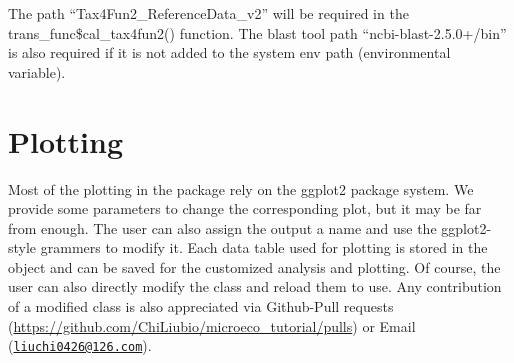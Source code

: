 \documentclass[
]{book}
\newenvironment{Shaded}{\begin{snugshade}}{\end{snugshade}}
\newcommand{\AttributeTok}[1]{\textcolor[rgb]{0.77,0.63,0.00}{#1}}
\newcommand{\CommentTok}[1]{\textcolor[rgb]{0.56,0.35,0.01}{\textit{#1}}}
\newcommand{\ConstantTok}[1]{\textcolor[rgb]{0.00,0.00,0.00}{#1}}
\newcommand{\FunctionTok}[1]{\textcolor[rgb]{0.00,0.00,0.00}{#1}}
\newcommand{\NormalTok}[1]{#1}
\newcommand{\OtherTok}[1]{\textcolor[rgb]{0.56,0.35,0.01}{#1}}
\newcommand{\SpecialCharTok}[1]{\textcolor[rgb]{0.00,0.00,0.00}{#1}}
\newcommand{\StringTok}[1]{\textcolor[rgb]{0.31,0.60,0.02}{#1}}
\begin{document}
The path ``Tax4Fun2\_ReferenceData\_v2'' will be required in the trans\_func\$cal\_tax4fun2() function.
The blast tool path ``ncbi-blast-2.5.0+/bin'' is also required if it is not added to the system env path (environmental variable).

\begin{Shaded}
\end{Shaded}

\hypertarget{plotting}{%
\section{Plotting}\label{plotting}}

Most of the plotting in the package rely on the ggplot2 package system.
We provide some parameters to change the corresponding plot, but it may be far from enough.
The user can also assign the output a name and use the ggplot2-style grammers to modify it.
Each data table used for plotting is stored in the object and can be saved for the customized analysis and plotting.
Of course, the user can also directly modify the class and reload them to use.
Any contribution of a modified class is also appreciated via Github-Pull requests (\url{https://github.com/ChiLiubio/microeco_tutorial/pulls}) or Email (\href{mailto:liuchi0426@126.com}{\nolinkurl{liuchi0426@126.com}}).
\end{document}
